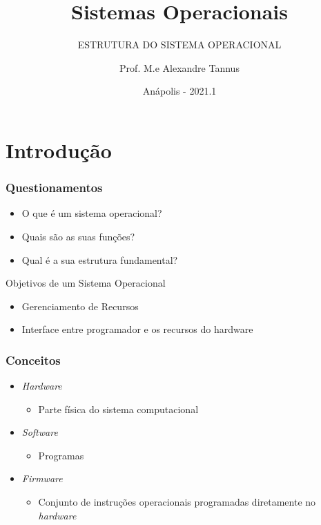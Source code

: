 \documentclass[aspectratio=169,
				xcolor=table]{beamer}
\institute[]{\uppercase{Engenharia de Software}}
\title[]{Sistemas Operacionais}
\subtitle[]{\uppercase{Estrutura do Sistema Operacional}}
\author[]{Prof. M.e Alexandre Tannus}
\date{Anápolis - 2021.1}
\begin{document}
	\begin{frame}
		\titlepage
		
	\end{frame}

	\begin{frame}
		\tableofcontents
	\end{frame}	
	
	\section{Introdução}
	
	\begin{frame}
		\frametitle{Questionamentos}
		\begin{itemize}
			\item O que é um sistema operacional?
			\vspace{1em}
			\item Quais são as suas funções?
			\vspace{1em}
			\item Qual é a sua estrutura fundamental?
		\end{itemize}
	\end{frame}	
	
	
	\begin{frame}{Objetivos de um Sistema Operacional}
		\begin{itemize}
			\item Gerenciamento de Recursos
			\item Interface entre programador e os recursos do hardware
		\end{itemize}
	\end{frame}
	
	\begin{frame}
		\frametitle{Conceitos}
		\begin{itemize}
			\item \textit{Hardware}
			\begin{itemize}
				\item Parte física do sistema computacional
			\end{itemize}
			\vspace{1em}
			\item \textit{Software}
			\begin{itemize}
				\item Programas 
			\end{itemize}
			\vspace{1em}
			\item \textit{Firmware}
			\begin{itemize}
				\item Conjunto de instruções operacionais programadas diretamente no \textit{hardware}
			\end{itemize}
			\vspace{1em}
		\end{itemize}
	\end{frame}
\end{document}
